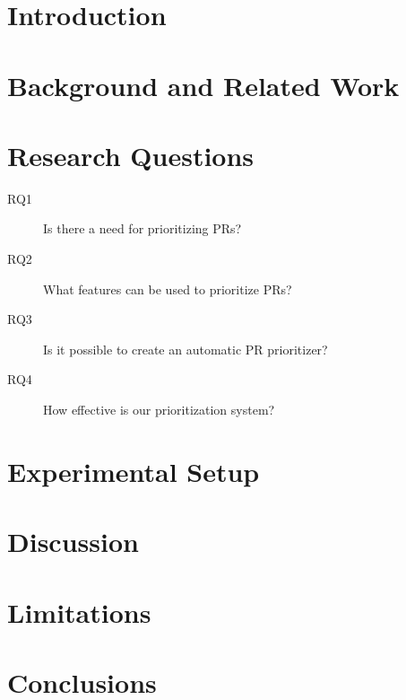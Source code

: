 \documentclass[conference]{IEEEtran}
\begin{document}
\maketitle

\begin{abstract}

\end{abstract}




\section{Introduction}

\section{Background and Related Work}

\section{Research Questions}

\begin{description}
  \item[RQ1] Is there a need for prioritizing PRs?
  \item[RQ2] What features can be used to prioritize PRs?
  \item[RQ3] Is it possible to create an automatic PR prioritizer?
  \item[RQ4] How effective is our prioritization system?
\end{description}







\section{Experimental Setup}



\section{Discussion}

\section{Limitations}

\section{Conclusions}



\end{document}
